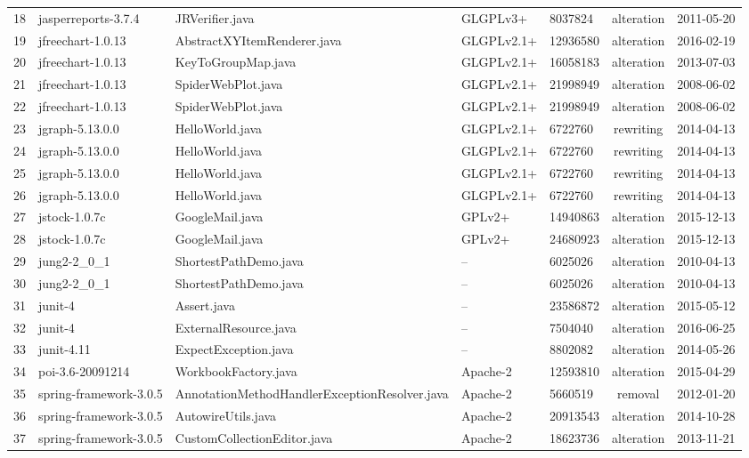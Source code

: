 \documentclass{sig-alternate-05-2015}
\begin{document}
\begin{table}
{\begin{tabular}{r|l|l|l|l|c|l}
		18 & jasperreports-3.7.4 & JRVerifier.java & GLGPLv3+ & 8037824 & alteration & 2011-05-20 \\
		19 & jfreechart-1.0.13 & AbstractXYItemRenderer.java & GLGPLv2.1+ & 12936580 & alteration & 2016-02-19 \\
		20 & jfreechart-1.0.13 & KeyToGroupMap.java & GLGPLv2.1+ & 16058183 & alteration & 2013-07-03 \\
		21 & jfreechart-1.0.13 & SpiderWebPlot.java & GLGPLv2.1+ & 21998949 & alteration & 2008-06-02 \\
		22 & jfreechart-1.0.13 & SpiderWebPlot.java & GLGPLv2.1+ & 21998949 & alteration & 2008-06-02 \\
		23 & jgraph-5.13.0.0 & HelloWorld.java & GLGPLv2.1+ & 6722760 & rewriting & 2014-04-13 \\
		24 & jgraph-5.13.0.0 & HelloWorld.java & GLGPLv2.1+ & 6722760 & rewriting & 2014-04-13 \\
		25 & jgraph-5.13.0.0 & HelloWorld.java & GLGPLv2.1+ & 6722760 & rewriting & 2014-04-13 \\
		26 & jgraph-5.13.0.0 & HelloWorld.java & GLGPLv2.1+ & 6722760 & rewriting & 2014-04-13 \\
		27 & jstock-1.0.7c & GoogleMail.java & GPLv2+ & 14940863 & alteration & 2015-12-13 \\
		28 & jstock-1.0.7c & GoogleMail.java & GPLv2+ & 24680923 & alteration & 2015-12-13 \\
		29 & jung2-2\_0\_1 & ShortestPathDemo.java & -- & 6025026 & alteration & 2010-04-13 \\
		30 & jung2-2\_0\_1 & ShortestPathDemo.java & -- & 6025026 & alteration & 2010-04-13 \\
		31 & junit-4 & Assert.java & -- & 23586872 & alteration & 2015-05-12 \\
		32 & junit-4 & ExternalResource.java & -- & 7504040 & alteration & 2016-06-25 \\
		33 & junit-4.11 & ExpectException.java & -- & 8802082 & alteration & 2014-05-26 \\
		34 & poi-3.6-20091214 & WorkbookFactory.java & Apache-2 & 12593810 & alteration & 2015-04-29 \\
		35 & spring-framework-3.0.5 & AnnotationMethodHandlerExceptionResolver.java & Apache-2 & 5660519 & removal & 2012-01-20 \\
		36 & spring-framework-3.0.5 & AutowireUtils.java & Apache-2 & 20913543 & alteration & 2014-10-28 \\
		37 & spring-framework-3.0.5 & CustomCollectionEditor.java & Apache-2 & 18623736 & alteration & 2013-11-21 \\

\end{tabular}}
\end{table}
\end{document}
